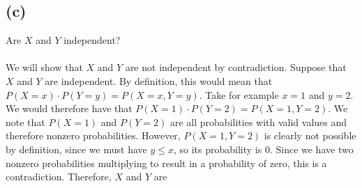 \documentclass{article}
\begin{document}
{\subsection*{(c)}
Are $X$ and $Y$ independent? \\ \\ 
We will show that $X$ and $Y$ are not independent by contradiction. Suppose that $X$ and $Y$ are independent. By definition, this would mean that $P(X = x) \cdot P(Y = y) = P(X = x, Y = y)$. Take for example $x = 1$ and $y = 2$. We would therefore have that $P(X = 1) \cdot P(Y = 2) = P(X = 1, Y = 2)$. We note that $P(X = 1)$ and $P(Y = 2)$ are all probabilities with valid values and therefore nonzero probabilities. However, $P(X = 1, Y = 2)$ is clearly not possible by definition, since we must have $y \leq x$, so its probability is 0. Since we have two nonzero probabilities multiplying to result in a probability of zero, this is a contradiction. Therefore, $X$ and $Y$ are 

}
\end{document}
